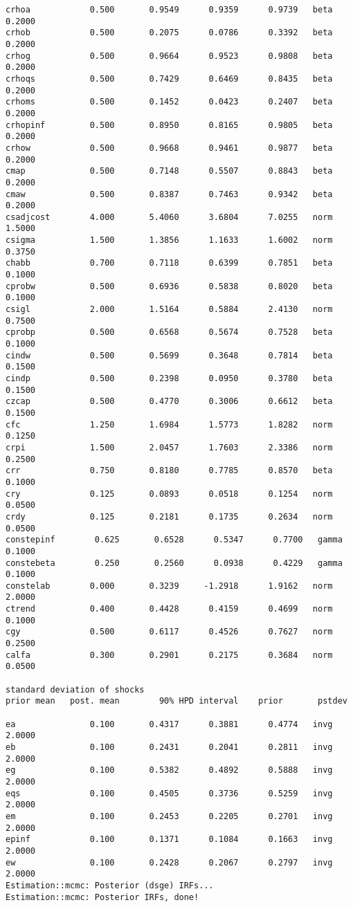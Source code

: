 \documentclass[]{article}
\begin{document}
\begin{verbatim}
crhoa            0.500       0.9549      0.9359      0.9739   beta        0.2000
crhob            0.500       0.2075      0.0786      0.3392   beta        0.2000
crhog            0.500       0.9664      0.9523      0.9808   beta        0.2000
crhoqs           0.500       0.7429      0.6469      0.8435   beta        0.2000
crhoms           0.500       0.1452      0.0423      0.2407   beta        0.2000
crhopinf         0.500       0.8950      0.8165      0.9805   beta        0.2000
crhow            0.500       0.9668      0.9461      0.9877   beta        0.2000
cmap             0.500       0.7148      0.5507      0.8843   beta        0.2000
cmaw             0.500       0.8387      0.7463      0.9342   beta        0.2000
csadjcost        4.000       5.4060      3.6804      7.0255   norm        1.5000
csigma           1.500       1.3856      1.1633      1.6002   norm        0.3750
chabb            0.700       0.7118      0.6399      0.7851   beta        0.1000
cprobw           0.500       0.6936      0.5838      0.8020   beta        0.1000
csigl            2.000       1.5164      0.5884      2.4130   norm        0.7500
cprobp           0.500       0.6568      0.5674      0.7528   beta        0.1000
cindw            0.500       0.5699      0.3648      0.7814   beta        0.1500
cindp            0.500       0.2398      0.0950      0.3780   beta        0.1500
czcap            0.500       0.4770      0.3006      0.6612   beta        0.1500
cfc              1.250       1.6984      1.5773      1.8282   norm        0.1250
crpi             1.500       2.0457      1.7603      2.3386   norm        0.2500
crr              0.750       0.8180      0.7785      0.8570   beta        0.1000
cry              0.125       0.0893      0.0518      0.1254   norm        0.0500
crdy             0.125       0.2181      0.1735      0.2634   norm        0.0500
constepinf        0.625       0.6528      0.5347      0.7700   gamma       0.1000
constebeta        0.250       0.2560      0.0938      0.4229   gamma       0.1000
constelab        0.000       0.3239     -1.2918      1.9162   norm        2.0000
ctrend           0.400       0.4428      0.4159      0.4699   norm        0.1000
cgy              0.500       0.6117      0.4526      0.7627   norm        0.2500
calfa            0.300       0.2901      0.2175      0.3684   norm        0.0500

standard deviation of shocks
prior mean   post. mean        90% HPD interval    prior       pstdev

ea               0.100       0.4317      0.3881      0.4774   invg        2.0000
eb               0.100       0.2431      0.2041      0.2811   invg        2.0000
eg               0.100       0.5382      0.4892      0.5888   invg        2.0000
eqs              0.100       0.4505      0.3736      0.5259   invg        2.0000
em               0.100       0.2453      0.2205      0.2701   invg        2.0000
epinf            0.100       0.1371      0.1084      0.1663   invg        2.0000
ew               0.100       0.2428      0.2067      0.2797   invg        2.0000
Estimation::mcmc: Posterior (dsge) IRFs...
Estimation::mcmc: Posterior IRFs, done!


\end{verbatim}	
	
\end{document}
